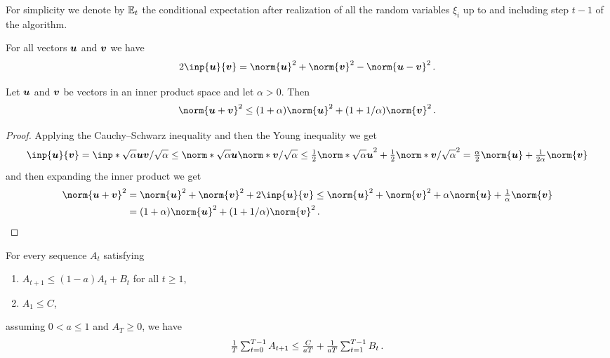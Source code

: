 \documentclass{article}
\begin{document}
For simplicity we denote by $\operatorname{\operatorname{\mathbb{E}}}_t$ the conditional expectation  after realization of all the random variables $\xi_i$ up to and including step $t-1$ of the algorithm.

\begin{lemma}\label{lem:cosine-thm}
  For all vectors $\bm{u}$ and $\bm{v}$ we have
  \[
  2 \inp{\uu}{\vv} = \norm{\uu}^2 + \norm{\vv}^2 - \norm{\uu-\vv}^2 \, .
  \]
\end{lemma}

\begin{lemma}\label{lem:ineq-young-norm}
  Let $\bm{u}$ and $\bm{v}$ be vectors in an inner product space and let $\alpha > 0$. Then
  \[
    \norm{\uu + \vv}^2 \leq (1 + \alpha) \norm{\uu}^2 + (1 + 1/\alpha) \norm{\vv}^2 \, .
  \]
\end{lemma}

\begin{proof}
  Applying the Cauchy--Schwarz inequality and then the Young inequality we get
  \[
    \inp{\uu}{\vv}
    =
    \inp*{\sqrt \alpha \uu }{\vv / \sqrt \alpha}
    \leq
    \norm*{\sqrt \alpha \uu} \norm*{\vv / \sqrt \alpha}
    \leq
    \tfrac{1}{2} \norm*{\sqrt \alpha \uu}^2 + \tfrac{1}{2} \norm*{\vv / \sqrt \alpha}^2
    =
    \tfrac{\alpha}{2} \norm{\uu} + \tfrac{1}{2 \alpha} \norm{\vv}
  \]
  and then expanding the inner product we get
  \begin{align*}
    \norm{\uu+\vv}^2
     & =
    \norm{\uu}^2 + \norm{\vv}^2 + 2 \inp{\uu}{\vv}
    \leq
    \norm{\uu}^2 + \norm{\vv}^2 + \alpha \norm{\uu} + \tfrac{1}{\alpha} \norm{\vv}
    \\
     & =
    (1 + \alpha) \norm{\uu}^2 + (1 + 1/\alpha) \norm{\vv}^2
    \, .
  \end{align*}
\end{proof}


\begin{lemma}\label{lem:bound-by-avg-method}
  For every sequence $A_t$ satisfying 
  \begin{enumerate}
    \item $A_{t+1} \le (1-a) A_t + B_t$ for all $t \geq 1$,
    \item $A_1 \le C$,
  \end{enumerate}
  assuming $0 < a \le 1$ and $A_{T} \ge 0$, we have
  \[
    \tfrac{1}{T} \textstyle\sum_{t=0}^{T-1} A_{t+1}
     \le 
    \tfrac{C}{a T} + \tfrac{1}{a T} \textstyle\sum_{t=1}^{T-1} B_t \, .
  \]
\end{lemma}
\end{document}
